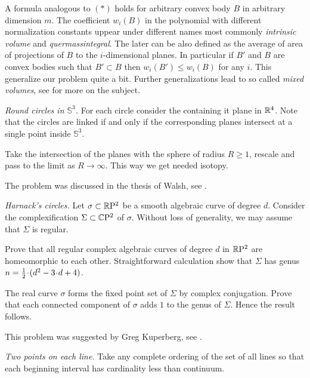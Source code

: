 A formula analogous to $({*})$
holds for arbitrary convex body $B$ in arbitrary dimension $m$.
The coefficient $w_i(B)$ in the polynomial with different normalization constants 
uppear under different names most commonly
\emph{intrinsic volume} and
\emph{quermassintegral}.
The later can be also defined as the average 
of area of projections of $B$ to the $i$-dimensional planes.
In particular if $B'$ and $B$ are convex bodies such that $B'\subset B$
then $w_i(B')\le w_i(B)$ for any $i$.
This generalize our problem quite a bit.
Further generalizations lead to so called \emph{mixed volumes},
see \cite{burago-zalgaller} for more on the subject.



\textit{Round circles in $\mathbb{S}^3$.}
For each circle consider the containing it plane in $\mathbb{R}^4$.
Note that the circles are linked 
if and only if 
the corresponding planes intersect at a single point inside $\mathbb{S}^3$.

Take the intersection of the planes with the sphere of radius $R\ge 1$,
rescale and pass to the limit as $R\to\infty$.  
This way we get needed isotopy.

The problem was discussed in the thesis of Walsh, see \cite{walsh}.

\textit{Harnack's circles.}
Let $\sigma\subset \mathbb{R}\mathrm{P}^2$ be a smooth algebraic curve of degree $d$.
Consider the complexification $\Sigma\subset \mathbb{C}\mathrm{P}^2$ of $\sigma$.
Without loss of generality, we may assume that $\Sigma$ is regular.

Prove that all regular complex algebraic curves of degree $d$ in $\mathbb{R}\mathrm{P}^2$
are homeomorphic to each other.
Straightforward calculation show that $\Sigma$ has genus $n\z=\tfrac12\cdot(d^2-3\cdot d+4)$.

The real curve $\sigma$ forms the fixed point set of $\Sigma$ by complex conjugation. 
Prove that each connected component of $\sigma$ adds $1$ to the genus of $\Sigma$.
Hence the result follows.

This problem was suggested by Greg Kuperberg, see \cite{One-step problems in geometry}.



\textit{Two points on each line.}
Take any complete ordering of the set of all lines 
so that each beginning interval has cardinality less than continuum.

